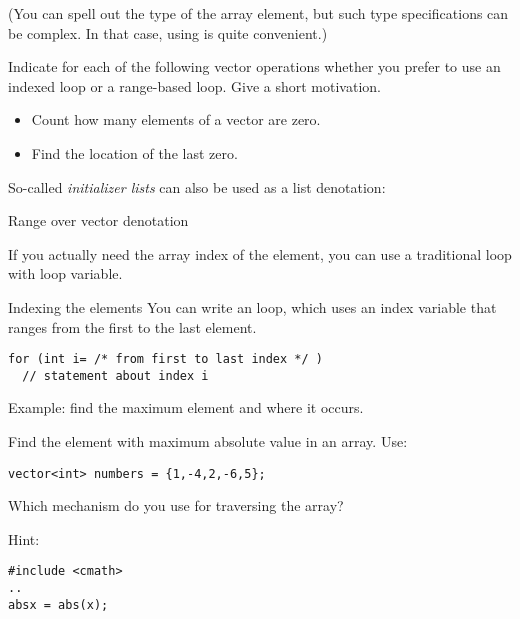(You can spell out the type of the array element, but such type
specifications can be complex. In that case, using  is
quite convenient.)

\begin{exercise}
  \label{ex:range-for}
  Indicate for each of the following vector operations whether you
  prefer to use an indexed loop or a range-based loop. Give a short
  motivation.
  \begin{itemize}
  \item Count how many elements of a vector are zero.
  \item Find the location of the last zero.
  \end{itemize}
\end{exercise}

So-called \emph{initializer lists}
can also be used as a list denotation:

\begin{block}{Range over vector denotation}
  \label{sl:range-denote}
\end{block}

If you actually need the array index of the element, you can use a
traditional  loop with loop variable.

\begin{block}{Indexing the elements}
  \label{sl:index-range}
  You can write an  loop, which uses an
  index variable that ranges from the first to the last element.
\begin{lstlisting}
for (int i= /* from first to last index */ )
  // statement about index i
\end{lstlisting}
Example: find the maximum element and where it occurs.
%
\end{block}

\begin{exercise}
  \label{ex:array-max}
  Find the element with maximum absolute value in an array. Use:
\begin{lstlisting}
vector<int> numbers = {1,-4,2,-6,5};
\end{lstlisting}
Which mechanism do you use for traversing the array?

Hint:
\begin{lstlisting}
#include <cmath>
..
absx = abs(x);
\end{lstlisting}
\end{exercise}

